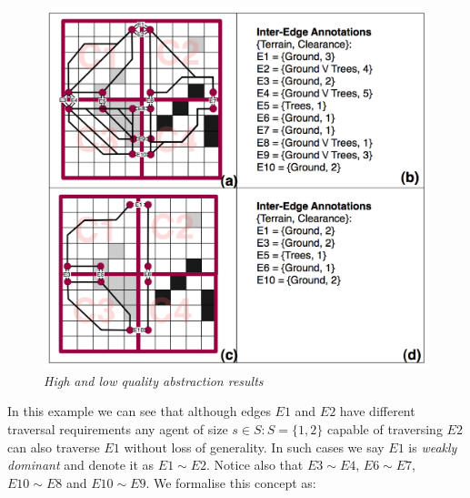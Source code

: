 \begin{figure}[htbp]
	\vspace{-12pt}
        \caption{\emph{High and low quality abstraction results} }
        \begin{center}
                        \includegraphics[scale=0.25, trim = 20mm 12mm 20mm 5mm]{diagrams/abstraction_result.png}
        \end{center}
        \label{aha-fig:abstractgraph}
	\vspace{-6pt}
\end{figure}
\par \indent
In this example we can see that although edges $E1$ and $E2$ have different traversal requirements any agent of size $s \in S : S = \lbrace 1, 2 \rbrace$ capable of traversing $E2$ can also traverse $E1$ without loss of generality. 
In such cases we say $E1$ is \emph{weakly dominant} and denote it as $E1 \sim E2$. 
Notice also that $E3 \sim E4$, $E6 \sim E7$, $E10 \sim E8$ and $E10 \sim E9$.
We formalise this concept as:
